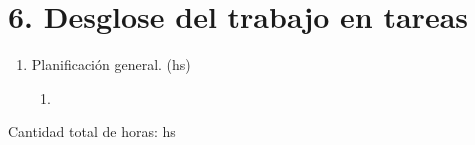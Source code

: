 \section{6. Desglose del trabajo en tareas}
\label{sec:wbs}


\begin{enumerate}
\item Planificación general. (hs)
	\begin{enumerate}
		\item 
	\end{enumerate}
\end{enumerate}

Cantidad total de horas: hs